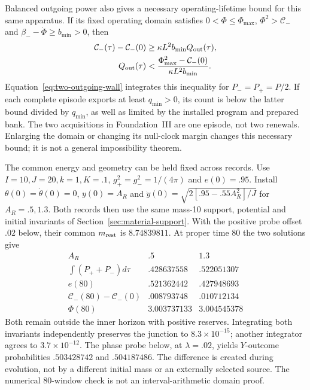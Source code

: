 Balanced outgoing power also gives a necessary operating-lifetime
bound for this same apparatus. If its fixed operating domain satisfies
$0<\Phi\le\Phi_{\max}$, $\Phi^2>\mathcal C_-$ and
$\beta_--\dot\Phi\ge b_{\min}>0$, then
\begin{align*}
 \mathcal C_-(\tau)-\mathcal C_-(0)
   &\ge\kappa L^2b_{\min}Q_{\rm out}(\tau),\\
 Q_{\rm out}(\tau)&<
 \frac{\Phi_{\max}^2-\mathcal C_-(0)}{\kappa L^2b_{\min}}.
\end{align*}
Equation~\eqref{eq:two-outgoing-wall} integrates this inequality for
$P_-=P_+=P/2$. If each complete episode exports at least
$q_{\min}>0$, its count is below the latter bound divided by
$q_{\min}$, as well as limited by the installed program and prepared
bank. The two acquisitions in Foundation~III are one episode, not two
renewals. Enlarging the domain or changing its null-clock margin changes
this necessary bound; it is not a general impossibility theorem.

The common energy and geometry can be held fixed across records.
Use $I=10,J=20,k=1,K=.1$, $g_+^2=g_-^2=1/(4\pi)$ and $e(0)=.95$.
Install $\theta(0)=\dot\theta(0)=0$, $y(0)=A_R$ and
$\dot y(0)=\sqrt{2[.95-.55A_R^2]/J}$ for $A_R=.5,1.3$.
Both records then use the same mass-10 support, potential and initial
invariants of Section~\ref{sec:material-support}. With the positive
probe offset $.02$ below, their common $m_{\rm rest}$ is $8.74839811$.
At proper time 80 the two solutions give
\begin{equation}\label{eq:mechanical-source-numbers}
\begin{array}{c|cc}
 A_R&.5&1.3\\\hline
 \int(P_++P_-)d\tau&.428637558&.522051307\\
 e(80)&.521362442&.427948693\\
 \mathcal C_-(80)-\mathcal C_-(0)&.008793748&.010712134\\
 \Phi(80)&3.003737133&3.004545378
\end{array}
\end{equation}
Both remain outside the inner horizon with positive reserves. Integrating
both invariants independently preserves the junction to $8.3\times10^{-15}$;
another integrator agrees to $3.7\times10^{-12}$. The phase probe below,
at $\lambda=.02$, yields $Y$-outcome probabilities $.503428742$ and
$.504187486$. The difference is created during evolution, not by a
different initial mass or an externally selected source. The numerical
80-window check is not an interval-arithmetic domain proof.

